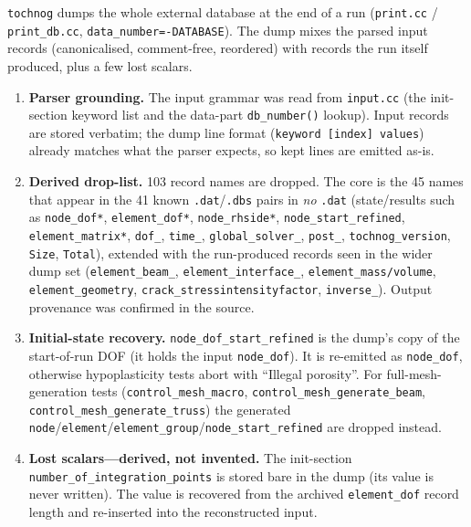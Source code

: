 \documentclass[11pt,a4paper]{report}
\newcommand{\code}[1]{\texttt{#1}}
\begin{document}
\code{tochnog} dumps the whole external database at the end of a run
(\code{print.cc} / \code{print\_\allowbreak db.cc}, \code{data\_\allowbreak number=-DATABASE}). The dump
mixes the parsed input records (canonicalised, comment-free, reordered) with
records the run itself produced, plus a few lost scalars.

\begin{enumerate}
  \item \textbf{Parser grounding.} The input grammar was read from
        \code{input.cc} (the init-section keyword list and the data-part
        \code{db\_\allowbreak number()} lookup). Input records are stored verbatim; the dump
        line format (\code{keyword [index] values}) already matches what the
        parser expects, so kept lines are emitted as-is.
  \item \textbf{Derived drop-list.} 103 record names are dropped. The core is
        the 45 names that appear in the 41 known \code{.dat}/\code{.dbs} pairs in
        \emph{no} \code{.dat} (state/results such as \code{node\_\allowbreak dof*},
        \code{element\_\allowbreak dof*}, \code{node\_\allowbreak rhside*}, \code{node\_\allowbreak start\_\allowbreak refined},
        \code{element\_\allowbreak matrix*}, \code{dof\_\allowbreak *}, \code{time\_\allowbreak *},
        \code{global\_\allowbreak solver\_\allowbreak *}, \code{post\_\allowbreak *}, \code{tochnog\_\allowbreak version},
        \code{Size}, \code{Total}), extended with the run-produced records seen
        in the wider dump set (\code{element\_\allowbreak beam\_\allowbreak *}, \code{element\_\allowbreak interface\_\allowbreak *},
        \code{element\_\allowbreak mass/\allowbreak volume}, \code{element\_\allowbreak geometry},
        \code{crack\_\allowbreak stressintensityfactor}, \code{inverse\_\allowbreak *}). Output provenance
        was confirmed in the source.
  \item \textbf{Initial-state recovery.} \code{node\_\allowbreak dof\_\allowbreak start\_\allowbreak refined} is the
        dump's copy of the start-of-run DOF (it holds the input \code{node\_\allowbreak dof}).
        It is re-emitted as \code{node\_\allowbreak dof}, otherwise hypoplasticity tests abort
        with ``Illegal porosity''. For full-mesh-generation tests
        (\code{control\_\allowbreak mesh\_\allowbreak macro}, \code{control\_\allowbreak mesh\_\allowbreak generate\_\allowbreak beam},
        \code{control\_\allowbreak mesh\_\allowbreak generate\_\allowbreak truss}) the generated
        \code{node}/\code{element}/\code{element\_\allowbreak group}/\code{node\_\allowbreak start\_\allowbreak refined}
        are dropped instead.
  \item \textbf{Lost scalars---derived, not invented.} The init-section
        \code{number\_\allowbreak of\_\allowbreak integration\_\allowbreak points} is stored bare in the dump (its
        value is never written). The value is recovered from the archived
        \code{element\_\allowbreak dof} record length and re-inserted into the reconstructed
        input.
\end{enumerate}
\end{document}
